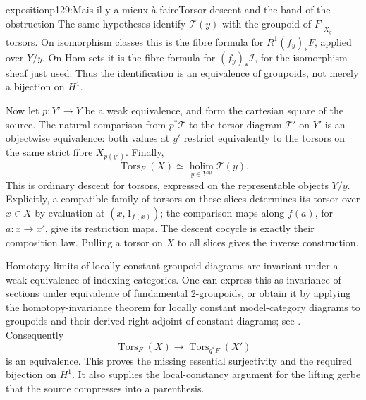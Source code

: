 \begin{dcomment}{exposition}{p129:Mais il y a mieux à faire}{Torsor descent and the band of the obstruction}
The same hypotheses identify \(\mathcal T(y)\) with the groupoid of \(F|_{X_y}\)-torsors. On isomorphism classes this is the fibre formula for \(R^1(f_y)_*F\), applied over \(Y/y\). On Hom sets it is the fibre formula for \((f_y)_*\mathcal I\), for the isomorphism sheaf just used. Thus the identification is an equivalence of groupoids, not merely a bijection on \(H^1\).

Now let \(p:Y'\longrightarrow Y\) be a weak equivalence, and form the cartesian square of the source. The natural comparison from \(p^*\mathcal T\) to the torsor diagram \(\mathcal T'\) on \(Y'\) is an objectwise equivalence: both values at \(y'\) restrict equivalently to the torsors on the same strict fibre \(X_{p(y')}\). Finally,
\[
 \operatorname{Tors}_F(X)
 \simeq \operatorname*{holim}_{y\in Y^{\mathrm{op}}}\mathcal T(y).
\]
This is ordinary descent for torsors, expressed on the representable objects \(Y/y\). Explicitly, a compatible family of torsors on these slices determines its torsor over \(x\in X\) by evaluation at \((x,1_{f(x)})\); the comparison maps along \(f(a)\), for \(a:x\longrightarrow x'\), give its restriction maps. The descent cocycle is exactly their composition law. Pulling a torsor on \(X\) to all slices gives the inverse construction.

Homotopy limits of locally constant groupoid diagrams are invariant under a weak equivalence of indexing categories. One can express this as invariance of sections under equivalence of fundamental \(2\)-groupoids, or obtain it by applying the homotopy-invariance theorem for locally constant model-category diagrams to groupoids and their derived right adjoint of constant diagrams; see \citet[Theorem 1.3]{Cisinski2009LocallyConstant}. Consequently
\[
 \operatorname{Tors}_F(X)\longrightarrow
 \operatorname{Tors}_{q^*F}(X')
\]
is an equivalence. This proves the missing essential surjectivity and the required bijection on \(H^1\). It also supplies the local-constancy argument for the lifting gerbe that the source compresses into a parenthesis.
\end{dcomment}

